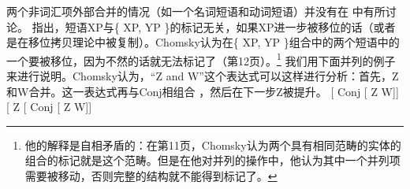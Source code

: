 两个非词汇项外部合并的情况（如一个名词短语和动词短语）并没有在 中有所讨论。 \citet[--44]{Chomsky2013a}指出，短语XP与\{ XP, YP \}的标记无关，如果XP进一步被移位的话（或者是在移位拷贝理论中被复制）。Chomsky认为在\{ XP, YP \}组合中的两个短语中的一个要被移位，因为不然的话就无法标记了（第12页）。\footnote{\label{fn-labeling-gleiche-Kategorie}%
他的解释是自相矛盾的：在第11页，Chomsky认为两个具有相同范畴的实体的组合的标记就是这个范畴。但是在他对并列的操作中，他认为其中一个并列项需要被移动，否则完整的结构就不能得到标记了。
}
我们用下面并列的例子来进行说明。Chomsky认为，“Z  and W”这个表达式可以这样进行分析：首先，Z和W合并。这一表达式再与Conj相组合 ，然后在下一步Z被提升。
\eal
\label{Chomsky-problems-of-projection-coordination}
\ex\label{ex-coord-a} {}[\sub{$\alpha$} Conj [\sub{$\beta$} Z W]]
\ex\label{ex-coord-b} {}[\sub{$\gamma$} Z [\sub{$\alpha$} Conj [\sub{$\beta$} Z W]]
\zl
